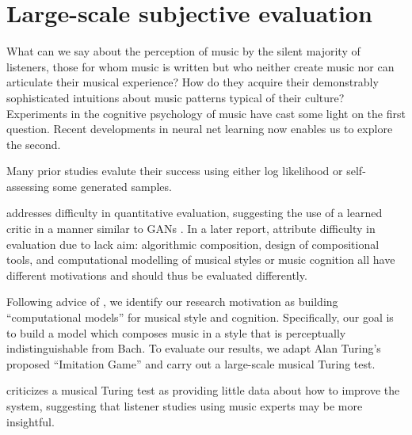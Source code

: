 \chapter{Large-scale subjective evaluation}
\begin{savequote}[75mm]
  What can we say about the perception of music by the silent majority of
  listeners, those for whom music is written but who neither create music nor
  can articulate their musical experience? How do they acquire their
  demonstrably sophisticated intuitions about music patterns
  typical of their culture? Experiments in the cognitive psychology of music
  have cast some light on the first question. Recent developments in neural net learning
  now enables us to explore the second.
\end{savequote}


\ifpdf
    \graphicspath{{Chapter6/Figs/Raster/}{Chapter6/Figs/PDF/}{Chapter6/Figs/}}
\else
    \graphicspath{{Chapter6/Figs/Vector/}{Chapter6/Figs/}}
\fi

Many prior studies \citep{Eck2002-blues,Allan2005,Boulanger-Lewandowski2012,Lyu2015}
evalute their success using either log likelihood or self-assessing
some generated samples.

\citep{pearce2001towards} addresses difficulty in quantitative evaluation,
suggesting the use of a learned critic in a manner similar to GANs
\citep{goodfellow2014generative}. In a later report,
\citep{pearce2002motivations} attribute difficulty in evaluation due to lack
aim: algorithmic composition, design of compositional tools, and computational
modelling of musical styles or music cognition all have different motivations
and should thus be evaluated differently.

Following advice of \citep{pearce2002motivations}, we identify our research
motivation as building ``computational models'' for musical style and cognition.
Specifically, our goal is to build a model which composes music in a style
that is perceptually indistinguishable from Bach.
To evaluate our results, we adapt Alan Turing's proposed ``Imitation Game''
\citep{turing1950computing} and carry out a large-scale musical Turing test.

\citep{ariza2009interrogator} criticizes a musical Turing test as providing little data about
how to improve the system, suggesting that listener studies using music experts
may be more insightful.

